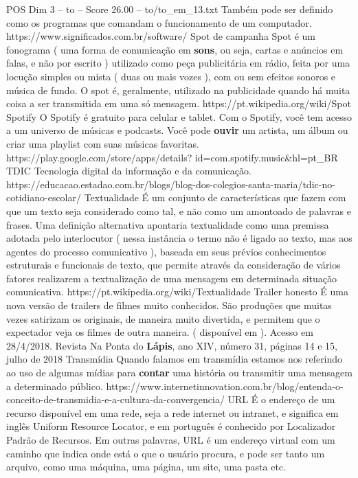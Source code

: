 \begin{textsample}{POS Dim 3 – to – Score 26.00 – to/to\_em\_13.txt}
Também pode ser definido como os programas que comandam o funcionamento de um computador. https://www.significados.com.br/software/ Spot de campanha Spot é um fonograma ( uma forma de comunicação em \textbf{sons}, ou seja, cartas e anúncios em falas, e não por escrito ) utilizado como peça publicitária em rádio, feita por uma locução simples ou mista ( duas ou mais vozes ), com ou sem efeitos sonoros e música de fundo.
O spot é, geralmente, utilizado na publicidade quando há muita coisa a ser transmitida em uma só mensagem. https://pt.wikipedia.org/wiki/Spot Spotify O Spotify é gratuito para celular e tablet.
Com o Spotify, você tem acesso a um universo de músicas e podcasts.
Você pode \textbf{ouvir} um artista, um álbum ou criar uma playlist com suas músicas favoritas. https://play.google.com/store/apps/details? id=com.spotify.music\&hl=pt\_BR TDIC Tecnologia digital da informação e da comunicação. https://educacao.estadao.com.br/blogs/blog-dos-colegios-santa-maria/tdic-no-cotidiano-escolar/ Textualidade É um conjunto de características que fazem com que um texto seja considerado como tal, e não como um amontoado de palavras e frases.
Uma definição alternativa apontaria textualidade como uma premissa adotada pelo interlocutor ( nessa instância o termo não é ligado ao texto, mas aos agentes do processo comunicativo ), baseada em seus prévios conhecimentos estruturais e funcionais de texto, que permite através da consideração de vários fatores realizarem a textualização de uma mensagem em determinada situação comunicativa. https://pt.wikipedia.org/wiki/Textualidade Trailer honesto É uma nova versão de trailers de filmes muito conhecidos.
São produções que muitas vezes satirizam os originais, de maneira muito divertida, e permitem que o expectador veja os filmes de outra maneira. ( disponível em ).
Acesso em 28/4/2018.
Revista Na Ponta do \textbf{Lápis}, ano XIV, número 31, páginas 14 e 15, julho de 2018 Transmídia Quando falamos em transmídia estamos nos referindo ao uso de algumas mídias para \textbf{contar} uma história ou transmitir uma mensagem a determinado público. https://www.internetinnovation.com.br/blog/entenda-o-conceito-de-transmidia-e-a-cultura-da-convergencia/ URL É o endereço de um recurso disponível em uma rede, seja a rede internet ou intranet, e significa em inglês Uniform Resource Locator, e em português é conhecido por Localizador Padrão de Recursos.
Em outras palavras, URL é um endereço virtual com um caminho que indica onde está o que o usuário procura, e pode ser tanto um arquivo, como uma máquina, uma página, um site, uma pasta etc.

\end{textsample}
